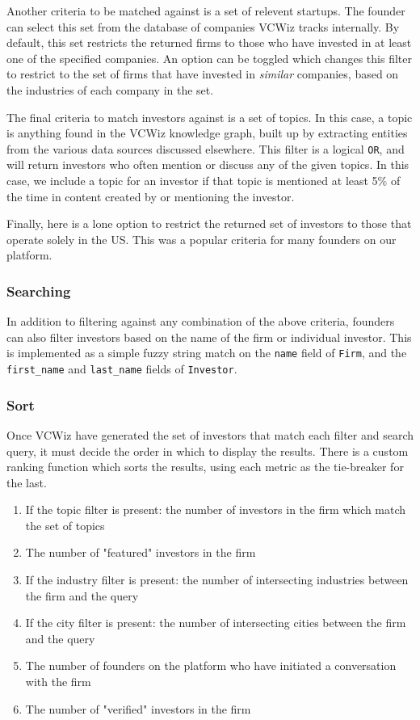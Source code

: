 Another criteria to be matched against is a set of relevent startups. The founder can select this set from the database of companies VCWiz tracks internally. By default, this set restricts the returned firms to those who have invested in at least one of the specified companies. An option can be toggled which changes this filter to restrict to the set of firms that have invested in \textit{similar} companies, based on the industries of each company in the set.

The final criteria to match investors against is a set of topics. In this case, a topic is anything found in the VCWiz knowledge graph, built up by extracting entities from the various data sources discussed elsewhere. This filter is a logical \texttt{OR}, and will return investors who often mention or discuss any of the given topics. In this case, we include a topic for an investor if that topic is mentioned at least 5\% of the time in content created by or mentioning the investor.

Finally, here is a lone option to restrict the returned set of investors to those that operate solely in the US. This was a popular criteria for many founders on our platform.

\subsubsection{Searching}

In addition to filtering against any combination of the above criteria, founders can also filter investors based on the name of the firm or individual investor. This is implemented as a simple fuzzy string match on the \texttt{name} field of \texttt{Firm}, and the \texttt{first\_name} and \texttt{last\_name} fields of \texttt{Investor}.

\subsubsection{Sort}

Once VCWiz have generated the set of investors that match each filter and search query, it must decide the order in which to display the results. There is a custom ranking function which sorts the results, using each metric as the tie-breaker for the last.

\begin{enumerate}
  \item If the topic filter is present: the number of investors in the firm which match the set of topics
  \item The number of "featured" investors in the firm
  \item If the industry filter is present: the number of intersecting industries between the firm and the query
  \item If the city filter is present: the number of intersecting cities between the firm and the query
  \item The number of founders on the platform who have initiated a conversation with the firm
  \item The number of "verified" investors in the firm
\end{enumerate}

